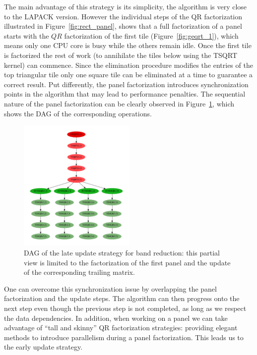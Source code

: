 The main advantage of this strategy is its simplicity,
the algorithm is very close to the LAPACK version. However the
individual steps of the QR factorization illustrated in
Figure~\ref{fig:rect_panel},
shows that a full factorization of a panel
starts with the $QR$ factorization of the first tile
(Figure~\ref{fig:geqrt_1}), which means only one CPU core is busy
while the others remain idle. Once the first tile is factorized the
rest of work (to annihilate the tiles below using the TSQRT
kernel) can commence.
Since the elimination procedure modifies the entries of the
top triangular tile only one square tile can be eliminated at a time
to guarantee a correct result.
Put differently,
the panel factorization introduces synchronization points
in the algorithm that
may lead to performance penalties.
The sequential nature of the panel factorization can be
clearly observed in Figure~\ref{fig:dag_panel},
which shows the DAG of the corresponding operations.

\begin{figure}
  \begin{center}
    \includegraphics[width=0.5\textwidth]{fig/dag}
  \end{center}
  \caption{DAG of the late update strategy for band reduction:
    this partial view is limited to the factorization of the first panel and
    the update of the corresponding trailing matrix.}
  \label{fig:dag_panel}
\end{figure}

One can overcome this synchronization issue by overlapping the panel
factorization and the update steps.
The algorithm can then progress onto the next step even
though the previous step is not completed,
as long as we respect the data dependencies.
In addition, when working on a panel we can
take advantage of ``tall and skinny'' QR factorization
strategies:
providing elegant methods to introduce parallelism
during a panel factorization.
This leads us to the early update strategy.

